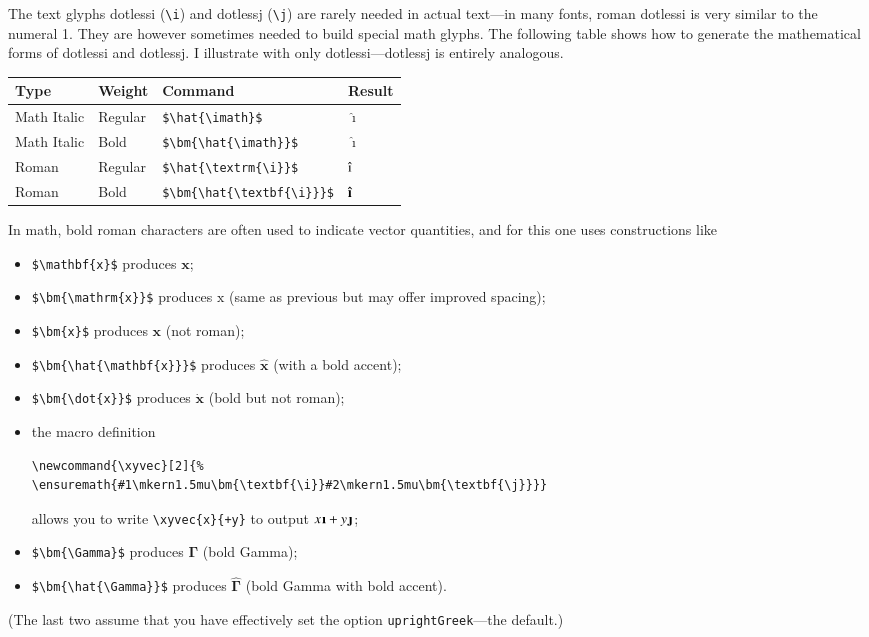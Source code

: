 \documentclass[11pt]{article}
\theoremstyle{oldplain}
\theoremstyle{plain}
\begin{document}
The text glyphs dotlessi (\verb|\i|) and dotlessj (\verb|\j|) are rarely needed in actual text---in many fonts, roman dotlessi is very similar to the numeral 1. They are however sometimes needed to build special math glyphs. The following table shows how to generate the mathematical forms of dotlessi and dotlessj. I illustrate with only dotlessi---dotlessj is entirely analogous.

\begin{center}
  \begin{tabular}{@{} llll @{}}
    \hline
    Type & Weight & Command & Result \\ 
    \hline
    Math Italic & Regular & \verb|$\hat{\imath}$| & $\hat{\imath}$ \\ 
    Math Italic & Bold & \verb|$\bm{\hat{\imath}}$| & $\bm{\hat{\imath}}$ \\ 
    Roman & Regular & \verb|$\hat{\textrm{\i}}$| & $\hat{\textrm{\i}}$\\ 
    Roman & Bold & \verb|$\bm{\hat{\textbf{\i}}}$| & $\bm{\hat{\textbf{\i}}}$\\ 
    \hline
  \end{tabular}
\end{center}
\newcommand{\xyvec}[2]{\ensuremath{#1\mkern1.5mu\bm{\textbf{\i}}#2\mkern1.5mu\bm{\textbf{\j}}}}

In math, bold roman characters are often used to indicate vector quantities, and for this one uses constructions like 
\begin{itemize}
\item
\verb|$\mathbf{x}$| produces $\mathbf{x}$;
\item
\verb|$\bm{\mathrm{x}}$| produces $\bm{\mathrm{x}}$ (same as previous but may offer improved spacing);
\item
\verb|$\bm{x}$| produces $\bm{x}$ (not roman);
\item
\verb|$\bm{\hat{\mathbf{x}}}$| produces $\bm{\hat{\mathbf{x}}}$ (with a bold accent);
\item \verb|$\bm{\dot{x}}$| produces $\bm{\dot{x}}$ (bold but not roman);
\item the macro definition
\begin{verbatim}
\newcommand{\xyvec}[2]{%
\ensuremath{#1\mkern1.5mu\bm{\textbf{\i}}#2\mkern1.5mu\bm{\textbf{\j}}}}
\end{verbatim}
allows you to write \verb|\xyvec{x}{+y}| to output $\xyvec{x}{+y}$;
\item \verb|$\bm{\Gamma}$| produces $\bm{\Gamma}$ (bold Gamma);
\item \verb|$\bm{\hat{\Gamma}}$| produces $\bm{\hat{\Gamma}}$ (bold Gamma with bold accent).
\end{itemize}
(The last two assume that you have effectively set the option {\tt uprightGreek}---the default.)
\end{document}
